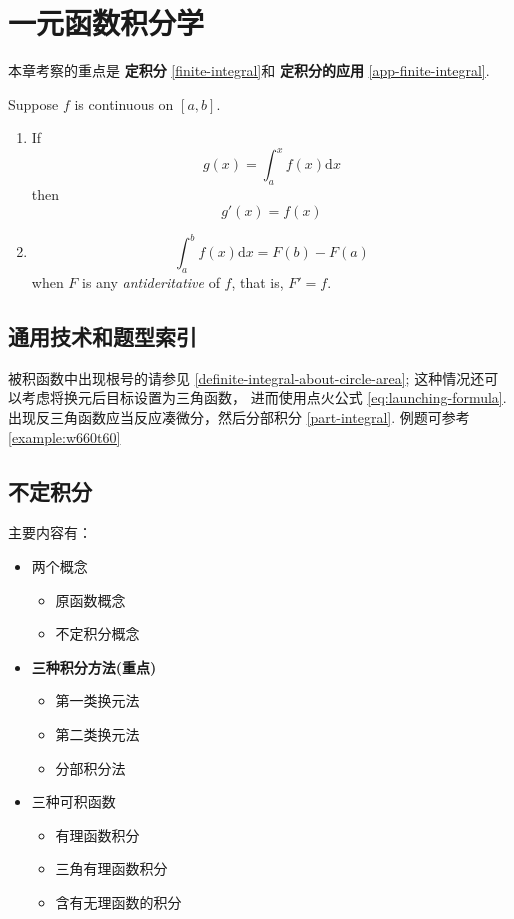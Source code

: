 \chapter{一元函数积分学}
\label{single-var-integral}

本章考察的重点是
\textbf{定积分} \ref{finite-integral}和
\textbf{定积分的应用} \ref{app-finite-integral}.

\begin{theorem}
    \label{thm:FCM}
    Suppose $f$ is continuous on $[a, b]$.
    \begin{enumerate}
        \item If \[g(x) = \int_a^x f(x) \mathrm dx\]then \[g'(x) = f(x)\]
        \item \[\int_a^b f(x) \mathrm dx = F(b) - F(a)\]
            when $F$ is any \emph{antideritative} of $f$, that is, $F' = f$.
    \end{enumerate}
\end{theorem}

\section{通用技术和题型索引}

被积函数中出现根号的请参见 \ref{definite-integral-about-circle-area};
这种情况还可以考虑将换元后目标设置为三角函数，
进而使用点火公式 \ref{eq:launching-formula}.
出现反三角函数应当反应凑微分，然后分部积分 \ref{part-integral}.
例题可参考 \ref{example:w660t60}

\section{不定积分} \label{infinite-integral}

主要内容有：
\begin{itemize}
    \item 两个概念
        \begin{itemize}
            \item 原函数概念
            \item 不定积分概念
        \end{itemize}
    \item \textbf{三种积分方法(重点)}
        \begin{itemize}
            \item 第一类换元法
            \item 第二类换元法
            \item 分部积分法
        \end{itemize}
    \item 三种可积函数
        \begin{itemize}
            \item 有理函数积分
            \item 三角有理函数积分
            \item 含有无理函数的积分
        \end{itemize}
\end{itemize}


